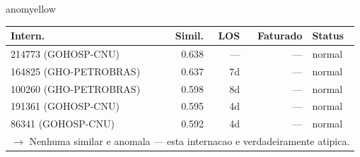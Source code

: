 \documentclass[a4paper,10pt]{article}
\begin{document}
\begin{anomalycard}[Internacao 7050 | GHO-PETROBRAS | MODERADO (z=2.15)]{anomyellow}
\begin{tabular}{l r r r l}\toprule\textbf{Intern.} & \textbf{Simil.} & \textbf{LOS} & \textbf{Faturado} & \textbf{Status} \\\midrule
214773 (GOHOSP-CNU) & 0.638 & --- & --- & \textcolor{jcubeblue}{normal} \\
164825 (GHO-PETROBRAS) & 0.637 & 7d & --- & \textcolor{jcubeblue}{normal} \\
100260 (GHO-PETROBRAS) & 0.598 & 8d & --- & \textcolor{jcubeblue}{normal} \\
191361 (GOHOSP-CNU) & 0.595 & 4d & --- & \textcolor{jcubeblue}{normal} \\
86341 (GOHOSP-CNU) & 0.592 & 4d & --- & \textcolor{jcubeblue}{normal} \\
\multicolumn{5}{l}{\textcolor{jcubeblue}{\small $\rightarrow$ Nenhuma similar e anomala --- esta internacao e verdadeiramente atipica.}} \\
\bottomrule\end{tabular}


\end{anomalycard}

\newpage
\end{document}
